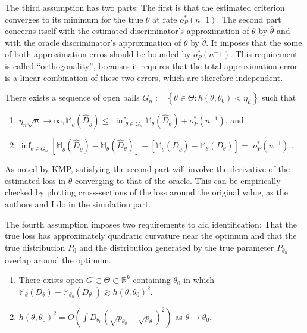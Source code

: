The third assumption has two parts: 
The first is that the estimated criterion converges to its minimum for the true $\theta$ at rate $o^{*}_P(n^-1)$. %
The second part concerns itself with the estimated discriminator's approximation of $\theta$ by $\hat{\theta}$
and with the oracle discriminator's approximation of $\theta$ by $\hat{\theta}$.
It imposes that the some of both approximation erros should be bounded by $o^{*}_P(n^-1)$.
This requirement is called ``orthogonality'', becauses it requires that the total approximation error is a linear combination of these two errors, which are therefore independent.

\begin{assumption}[A3, KMP]
    \label{a:3}
    There exists a sequence of open balls $G_{n}:=\left\{\theta \in \Theta: h\left(\theta, \theta_{0}\right)<\eta_{n}\right\}$ such that
    \begin{enumerate}
        \item $\eta_{n} \sqrt{n} \rightarrow \infty, \mathbb{M}_{\hat{\theta}}\left(\hat{D}_{\hat{\theta}}\right) \leq$ $\inf _{\theta \in G_{n}} \mathbb{M}_{\theta}\left(\hat{D}_{\theta}\right)+o_{P}^{*}\left(n^{-1}\right)$, and
        \item $\inf _{\theta \in G_{n}}\left[\mathbb{M}_{\hat{\theta}}\left(\hat{D}_{\hat{\theta}}\right)-\mathbb{M}_{\theta}\left(\hat{D}_{\theta}\right)\right]-\left[\mathbb{M}_{\hat{\theta}}\left(D_{\hat{\theta}}\right)-\mathbb{M}_{\theta}\left(D_{\theta}\right)\right]=$ $o_{P}^{*}\left(n^{-1}\right)$..
    \end{enumerate}
\end{assumption}

As noted by KMP, satisfying the second part will involve the derivative of the estimated loss in $\theta$ converging to that of the oracle. %
This can be empirically checked by plotting cross-sections of the loss around the original value, as the authors and I do in the simulation part.

The fourth assumption imposes two requirements to aid identification:
That the true loss has approximately quadratic curvature near the optimum and that the true distribution $P_{0}$ and the distribution generated by the true parameter $P_{\theta_0}$ overlap around the optimum.

\begin{assumption}[A4, KMP]
    \label{a:4}
    \begin{enumerate}
        \item There exists open $G \subset \Theta \subset \mathbb{R}^{k}$ containing $\theta_{0}$ in which $\mathbb{M}_{\theta}\left(D_{\theta}\right)-\mathbb{M}_{\theta_{0}}\left(D_{\theta_{0}}\right) \gtrsim h\left(\theta, \theta_{0}\right)^{2}$. 
        \item $h\left(\theta, \theta_{0}\right)^{2}=O\left(\int D_{\theta_{0}}\left(\sqrt{p_{\theta_{0}}}-\sqrt{p_{\theta}}\right)^{2}\right)$ as $\theta \rightarrow \theta_{0}$.
    \end{enumerate}
\end{assumption}

